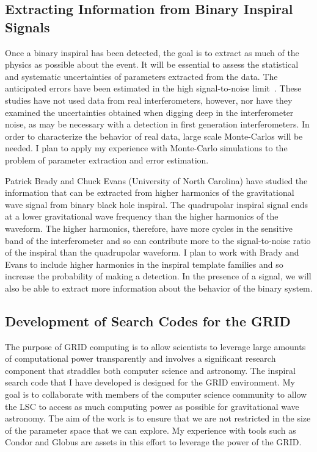\subsection{Extracting Information from Binary Inspiral Signals}

Once a binary inspiral has been detected, the goal is to extract as much of
the physics as possible about the event. It will be essential to assess the
statistical and systematic uncertainties of parameters extracted from the
data. The anticipated errors have been estimated in the high signal-to-noise
limit~\cite{Finn:1993xs,Chernoff:1993th,Cutler:1994}. These studies have not
used data from real interferometers, however, nor have they examined the
uncertainties obtained when digging deep in the interferometer
noise, as may be necessary with a detection in first generation
interferometers. In order to characterize the behavior of real data, large
scale Monte-Carlos will be needed. I plan to apply my experience with
Monte-Carlo simulations to the problem of parameter extraction and error
estimation.

Patrick Brady and Chuck Evans (University of North Carolina) have studied the
information that can be extracted from higher harmonics of the gravitational
wave signal from binary black hole inspiral. The quadrupolar inspiral signal
ends at a lower gravitational wave frequency than the higher harmonics of the
waveform.  The higher harmonics, therefore, have more cycles in the sensitive
band of the interferometer and so can contribute more to the signal-to-noise
ratio of the inspiral than the quadrupolar waveform.  I plan to work with
Brady and Evans to include higher
harmonics in the inspiral template families and so increase the probability of
making a detection. In the presence of a signal, we will also be able to
extract more information about the behavior of the binary system.

\subsection{Development of Search Codes for the GRID}

The purpose of GRID computing is to allow scientists to leverage large amounts
of computational power transparently and involves a significant research
component that straddles both computer science and astronomy. The inspiral
search code that I have developed is designed for the GRID environment.  My
goal is to collaborate with members of the computer science community to allow
the LSC to access as much computing power as possible for gravitational wave
astronomy.  The aim of the work is to ensure that we are not restricted in the
size of the parameter space that we can explore. My experience with tools such
as Condor and Globus are assets in this effort to leverage the power of the
GRID.

